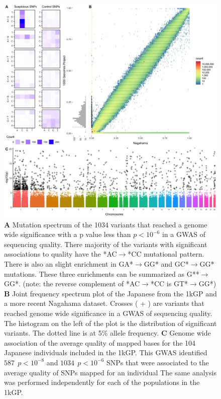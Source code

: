 \documentclass[9pt,lineno]{elife}
\begin{document}
\begin{figure}
\includegraphics[width=\hsize,keepaspectratio]{./Figures/Figure1.jpg}
\caption{
\textbf{A} 
Mutation spectrum of the 1034 variants that reached a genome wide significance with a p value less than $p < 10^{-6}$  in a GWAS of sequencing quality. 
There majority of the variants with significant associations to quality have the *AC${\rightarrow}$*CC mutational pattern. There is also an slight enrichment in GA*${\rightarrow}$GG* and GC*${\rightarrow}$GG* mutations. These three enrichments can be summarized as G**${\rightarrow}$GG*. (note: the reverse complement of *AC${\rightarrow}$*CC is GT*${\rightarrow}$GG*)
\textbf{B} 
Joint frequency spectrum plot of the Japanese from the 1kGP and a more recent Nagahama dataset.
Crosses ( + ) are variants that reached genome wide significance in a GWAS of sequencing quality. 
The histogram on the left of the plot is the distribution of significant variants. 
The dotted line is at 5\% allele frequency. 
\textbf{C} 
Genome wide association of the average quality of mapped bases for the 104 Japanese individuals included in the 1kGP. This GWAS identified $587\ \  p < 10^{-8}$ and $1034\ \ p < 10^{-6}$ SNPs that were associated to the average quality of SNPs mapped for an individual
The same analysis was performed independently for each of the populations in the 1kGP. }
 \label{SFS}
\end{figure}
\end{document}
